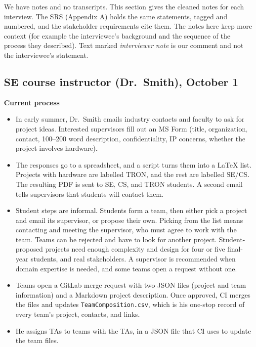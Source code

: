 \documentclass{article}
\begin{document}
    We have notes and no transcripts. This section gives the cleaned notes for each interview.
    The SRS (Appendix A) holds the same statements, tagged and numbered, and the stakeholder
    requirements cite them. The notes here keep more context (for example the interviewee's
    background and the sequence of the process they described). Text marked
    \emph{interviewer note} is our comment and not the interviewee's statement.

    \subsection{SE course instructor (Dr.~Smith), October 1}
    \label{int:SEI-1}

    \textbf{Current process}
    \begin{itemize}
        \item In early summer, Dr.~Smith emails industry contacts and faculty to ask for
        project ideas. Interested supervisors fill out an MS Form (title, organization, contact, 100--200 word
        description, confidentiality, IP concerns, whether the project involves hardware).
        \item The responses go to a spreadsheet, and a script turns them into a LaTeX list.
        Projects with hardware are labelled TRON, and the rest are labelled SE/CS. The resulting
        PDF is sent to SE, CS, and TRON students. A second email tells supervisors that
        students will contact them.
        \item Student steps are informal. Students form a team, then either pick a project
        and email its supervisor, or propose their own. Picking from the list means
        contacting and meeting the supervisor, who must agree to work with the team. Teams can be rejected and
        have to look for another project. Student-proposed projects need enough complexity and
        design for four or five final-year students, and real stakeholders. A supervisor is
        recommended when domain expertise is needed, and some teams open a request without one.
        \item Teams open a GitLab merge request with two JSON files (project and team information) and a
        Markdown project description. Once approved, CI merges the files and updates
        \texttt{TeamComposition.csv}, which is his one-stop record of every team's project,
        contacts, and links.
        \item He assigns TAs to teams with the TAs, in a JSON file that CI uses to update the team files.
    \end{itemize}
\end{document}

